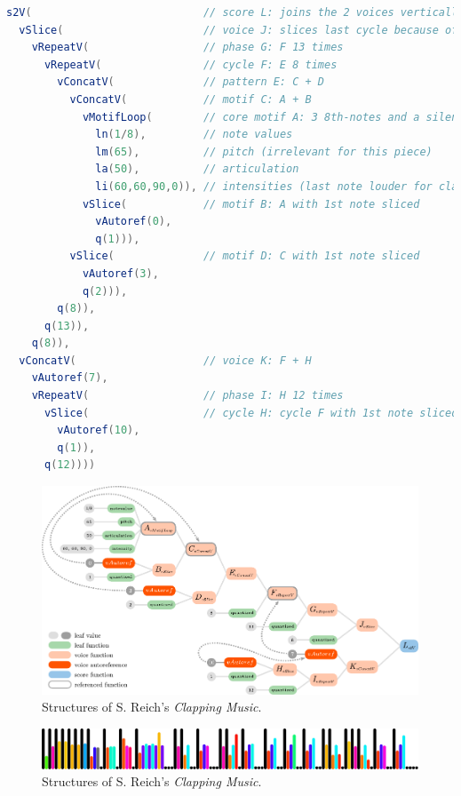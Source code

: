 \documentclass{article}
\begin{document}
\begin{lstlisting}[language=Java, caption=A possible decoded genotype for S. Reich's \emph{Clapping Music}]
s2V(                           // score L: joins the 2 voices vertically
  vSlice(                      // voice J: slices last cycle because of phase lag
    vRepeatV(                  // phase G: F 13 times
      vRepeatV(                // cycle F: E 8 times 
        vConcatV(              // pattern E: C + D
          vConcatV(            // motif C: A + B
            vMotifLoop(        // core motif A: 3 8th-notes and a silence
              ln(1/8),         // note values
              lm(65),          // pitch (irrelevant for this piece)
              la(50),          // articulation
              li(60,60,90,0)), // intensities (last note louder for clarity) 
            vSlice(            // motif B: A with 1st note sliced
              vAutoref(0),
              q(1))),
          vSlice(              // motif D: C with 1st note sliced
            vAutoref(3),
            q(2))),
        q(8)),
      q(13)),
    q(8)),
  vConcatV(                    // voice K: F + H
    vAutoref(7),
    vRepeatV(                  // phase I: H 12 times 
      vSlice(                  // cycle H: cycle F with 1st note sliced
        vAutoref(10),
        q(1)),
      q(12))))
\end{lstlisting}


\begin{figure}
  \includegraphics[width=\linewidth]{figs/clapping_tree_graph_colours_code.pdf}
  \caption{Structures of S. Reich's \emph{Clapping Music}.}
  \label{fig:boat2}
\end{figure}



\begin{figure}
\begin{center}
  \includegraphics[width=13cm]{figs/clappingVisualized.pdf}
\end{center}  
  \caption{Structures of S. Reich's \emph{Clapping Music}.}
  \label{fig:boat3}
\end{figure}
\end{document}
